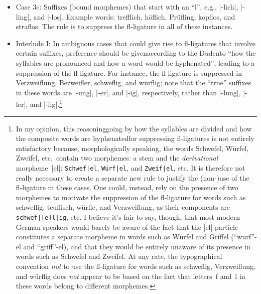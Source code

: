 \documentclass[11pt]{article}
\begin{document}
\begin{itemize}
\begin{itemize}
I haven't found a clear justification for this rule so far. I assume it is made because unligated f\breaklig i pairs may be sufficiently unsightly as to constitute an infraction against good typography that's even more grievous than having fi and ffi ligatures span the boundary between a main word and a suffix.


\item Case 3c: Suffixes (bound morphemes) that start with an \enquote{l}, e.g., |-lich|, |-ling|, and |-los|. Example words: trefflich, höflich, Prüfling, kopflos, and s\breaklig traflos. The rule is to suppress the fl-ligature in all of these instances. 

\item Interlude I: In ambiguous cases that could give rise to fl-ligatures that involve certain suffixes, preference should be given\textemdash according to the Duden\textemdash to \enquote{how the syllables are pronounced and how a word would be hyphenated}, leading to a suppression of the fl-ligature. For instance, the fl-ligature is suppressed in Verzweif\-lung, Bezweifler, schweflig, and würflig; note that the \enquote{true} suffixes in these words are |-ung|, |-er|, and |-ig|, respectively, rather than |-lung|, |-ler|, and |-lig|.\footnote{%
In my opinion, this reasoning\textemdash going by how the syllables are divided and how the composite words are hyphenated\textemdash for suppressing fl-ligatures is not entirely satisfactory because, morphologically speaking, the words Schwefel, Würfel, Zweifel, etc.\ contain two morphemes: a stem and the \emph{derivational} morpheme~|el|: \Verb+Schwef|el+, \Verb+Würf|el+, and \Verb+Zweif|el+, etc. It is therefore not really necessary to create a separate new rule to justify the (non-)use of the fl-ligature in these cases. One could, instead, rely on the presence of two morphemes to motivate the suppression of the fl-ligature for words such as schweflig, teuflisch, würfle, and Verzweiflung, as their components are \Verb+schwef|[e]l|ig+, etc. I believe it's fair to say, though, that most modern German speakers would barely be aware of the fact that the |el| particle constitutes a separate morpheme in words such as Würfel and Griffel (\enquote{wurf}-el and \enquote{griff}-el), and that they would be entirely unaware of its presence in words such as Schwefel and Zweifel. At any rate, the typographical convention \emph{not} to use the fl-ligature for words such as schweflig, Verzweiflung, and würflig does \emph{not} appear to be based on the fact that letters~f and~l in these words belong to different morphemes.}


\end{itemize}
\end{itemize}
\end{document}
